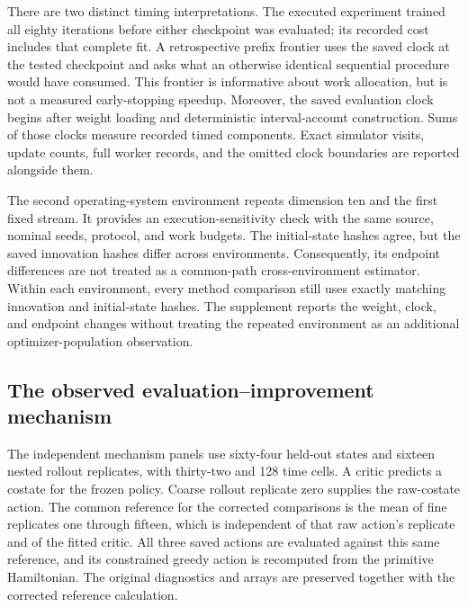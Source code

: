 There are two distinct timing interpretations. The executed experiment trained all eighty iterations before either checkpoint was evaluated; its recorded cost includes that complete fit. A retrospective prefix frontier uses the saved clock at the tested checkpoint and asks what an otherwise identical sequential procedure would have consumed. This frontier is informative about work allocation, but is not a measured early-stopping speedup. Moreover, the saved evaluation clock begins after weight loading and deterministic interval-account construction. Sums of those clocks measure recorded timed components. Exact simulator visits, update counts, full worker records, and the omitted clock boundaries are reported alongside them.

The second operating-system environment repeats dimension ten and the first fixed stream. It provides an execution-sensitivity check with the same source, nominal seeds, protocol, and work budgets. The initial-state hashes agree, but the saved innovation hashes differ across environments. Consequently, its endpoint differences are not treated as a common-path cross-environment estimator. Within each environment, every method comparison still uses exactly matching innovation and initial-state hashes. The supplement reports the weight, clock, and endpoint changes without treating the repeated environment as an additional optimizer-population observation.

\subsection{The observed evaluation--improvement mechanism}
The independent mechanism panels use sixty-four held-out states and sixteen nested rollout replicates, with thirty-two and 128 time cells. A critic predicts a costate for the frozen policy. Coarse rollout replicate zero supplies the raw-costate action. The common reference for the corrected comparisons is the mean of fine replicates one through fifteen, which is independent of that raw action's replicate and of the fitted critic. All three saved actions are evaluated against this same reference, and its constrained greedy action is recomputed from the primitive Hamiltonian. The original diagnostics and arrays are preserved together with the corrected reference calculation.




